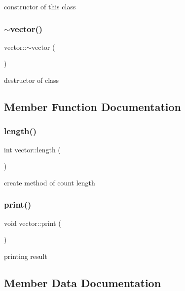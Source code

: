 constructor of this class \hypertarget{classvector_a7f8c4cd49dff8799dd98cb3e84242eda}{}\label{classvector_a7f8c4cd49dff8799dd98cb3e84242eda} 
\subsubsection{\texorpdfstring{$\sim$vector()}{~vector()}}
{\footnotesize\ttfamily vector\+::$\sim$vector (\begin{DoxyParamCaption}{ }\end{DoxyParamCaption})\hspace{0.3cm}{\ttfamily [inline]}}

destructor of class 

\subsection{Member Function Documentation}
\hypertarget{classvector_af227c6b920f64fded51b56cd0c26e8f5}{}\label{classvector_af227c6b920f64fded51b56cd0c26e8f5} 
\subsubsection{\texorpdfstring{length()}{length()}}
{\footnotesize\ttfamily int vector\+::length (\begin{DoxyParamCaption}{ }\end{DoxyParamCaption})\hspace{0.3cm}{\ttfamily [inline]}}

create method of count length \hypertarget{classvector_a53c6b3d32c7120f215925023b38ed8fd}{}\label{classvector_a53c6b3d32c7120f215925023b38ed8fd} 
\subsubsection{\texorpdfstring{print()}{print()}}
{\footnotesize\ttfamily void vector\+::print (\begin{DoxyParamCaption}{ }\end{DoxyParamCaption})\hspace{0.3cm}{\ttfamily [inline]}}

printing result 

\subsection{Member Data Documentation}
\hypertarget{classvector_a1e27b3cada38776acca9d001711d4fa2}{}\label{classvector_a1e27b3cada38776acca9d001711d4fa2} 
